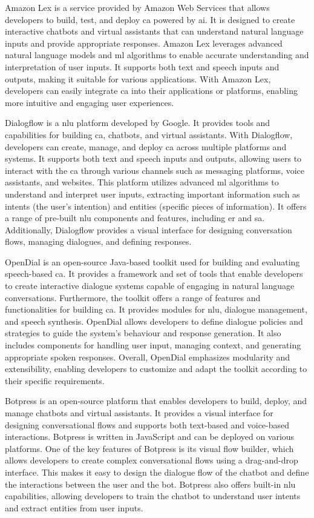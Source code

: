 \documentclass[a4paper,fleqn]{cas-dc}
\begin{document}
Amazon Lex \cite{aws} is a service provided by Amazon Web Services that allows developers to build, test, and deploy \gls{ca} powered by \gls{ai}. It is designed to create interactive chatbots and virtual assistants that can understand natural language inputs and provide appropriate responses. Amazon Lex leverages advanced natural language models and \gls{ml} algorithms to enable accurate understanding and interpretation of user inputs. It supports both text and speech inputs and outputs, making it suitable for various applications. With Amazon Lex, developers can easily integrate \gls{ca} into their applications or platforms, enabling more intuitive and engaging user experiences.

Dialogflow \cite{dialogflow} is a \gls{nlu} platform developed by Google. It provides tools and capabilities for building \gls{ca}, chatbots, and virtual assistants. With Dialogflow, developers can create, manage, and deploy \gls{ca} across multiple platforms and systems. It supports both text and speech inputs and outputs, allowing users to interact with the \gls{ca} through various channels such as messaging platforms, voice assistants, and websites. This platform utilizes advanced \gls{ml} algorithms to understand and interpret user inputs, extracting important information such as intents (the user's intention) and entities (specific pieces of information). It offers a range of pre-built \gls{nlu} components and features, including \gls{er} and \gls{sa}. Additionally, Dialogflow provides a visual interface for designing conversation flows, managing dialogues, and defining responses.

OpenDial \cite{opendial} is an open-source Java-based toolkit used for building and evaluating speech-based \gls{ca}. It provides a framework and set of tools that enable developers to create interactive dialogue systems capable of engaging in natural language conversations. Furthermore, the toolkit offers a range of features and functionalities for building \gls{ca}. It provides modules for \gls{nlu}, dialogue management, and speech synthesis. OpenDial allows developers to define dialogue policies and strategies to guide the system's behaviour and response generation. It also includes components for handling user input, managing context, and generating appropriate spoken responses. Overall, OpenDial emphasizes modularity and extensibility, enabling developers to customize and adapt the toolkit according to their specific requirements. 

Botpress \cite{botpress} is an open-source platform that enables developers to build, deploy, and manage chatbots and virtual assistants. It provides a visual interface for designing conversational flows and supports both text-based and voice-based interactions. Botpress is written in JavaScript and can be deployed on various platforms. One of the key features of Botpress is its visual flow builder, which allows developers to create complex conversational flows using a drag-and-drop interface. This makes it easy to design the dialogue flow of the chatbot and define the interactions between the user and the bot. Botpress also offers built-in \gls{nlu} capabilities, allowing developers to train the chatbot to understand user intents and extract entities from user inputs.
\end{document}
